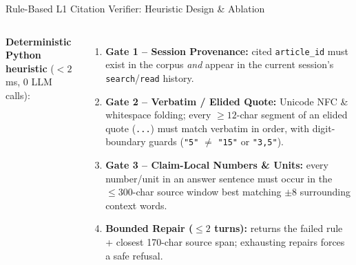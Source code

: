 \documentclass[aspectratio=1610,11pt]{beamer}
\begin{document}
\begin{frame}{Rule-Based L1 Citation Verifier: Heuristic Design \& Ablation}
  \begin{columns}[T]
    \scriptsize
    \textbf{Deterministic Python heuristic} ($<2$\,ms, 0 LLM calls):
    \vspace{2pt}
    \begin{enumerate}\scriptsize
      \item \textbf{Gate 1 -- Session Provenance:} cited \texttt{article\_id} must exist in the corpus \emph{and} appear in the current session's \texttt{search}/\texttt{read} history.
      \item \textbf{Gate 2 -- Verbatim / Elided Quote:} Unicode NFC \& whitespace folding; every $\ge 12$-char segment of an elided quote (\texttt{...}) must match verbatim in order, with digit-boundary guards (\texttt{"5"} $\neq$ \texttt{"15"} or \texttt{"3,5"}).
      \item \textbf{Gate 3 -- Claim-Local Numbers \& Units:} every number/unit in an answer sentence must occur in the $\le 300$-char source window best matching $\pm 8$ surrounding context words.
      \item \textbf{Bounded Repair ($\le 2$ turns):} returns the failed rule + closest 170-char source span; exhausting repairs forces a safe refusal.
    \end{enumerate}


\end{columns}
\end{frame}
\end{document}
